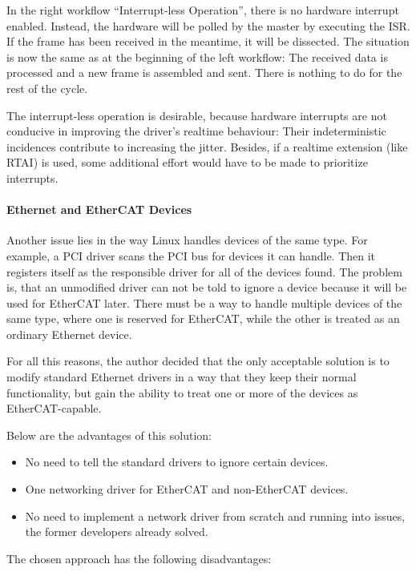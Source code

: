 \documentclass[a4paper,12pt,BCOR=6mm,bibtotoc,idxtotoc]{scrbook}
\begin{document}
In the right workflow ``Interrupt-less Operation'', there is no hardware
interrupt enabled.  Instead, the hardware will be polled by the master by
executing the ISR. If the frame has been received in the meantime, it will be
dissected. The situation is now the same as at the beginning of the left
workflow: The received data is processed and a new frame is assembled and
sent. There is nothing to do for the rest of the cycle.

The interrupt-less operation is desirable, because hardware interrupts are not
conducive in improving the driver's realtime behaviour: Their indeterministic
incidences contribute to increasing the jitter. Besides, if a realtime
extension (like RTAI) is used, some additional effort would have to be made to
prioritize interrupts.

\paragraph{Ethernet and EtherCAT Devices} Another issue lies in the way Linux
handles devices of the same type.  For example, a
PCI driver
scans the PCI bus for devices it can handle. Then it registers itself as the
responsible driver for all of the devices found. The problem is, that an
unmodified driver can not be told to ignore a device because it will be used
for EtherCAT later. There must be a way to handle multiple devices of the same
type, where one is reserved for EtherCAT, while the other is treated as an
ordinary Ethernet device.

For all this reasons, the author decided that the only acceptable solution is
to modify standard Ethernet drivers in a way that they keep their normal
functionality, but gain the ability to treat one or more of the devices as
EtherCAT-capable.

Below are the advantages of this solution:

\begin{itemize}
\item No need to tell the standard drivers to ignore certain devices.
\item One networking driver for EtherCAT and non-EtherCAT devices.
\item No need to implement a network driver from scratch and running
  into issues, the former developers already solved.
\end{itemize}

The chosen approach has the following disadvantages:
\end{document}
